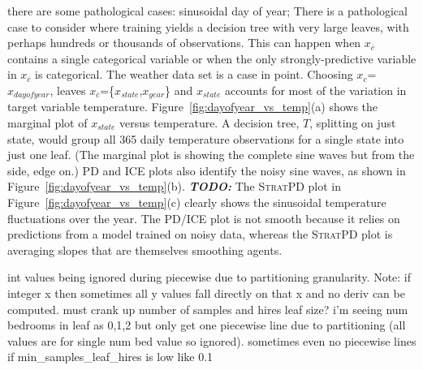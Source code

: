 \documentclass[12pt]{article}
\newcommand{\figref}[1]{Figure~\ref{#1}}
\newcommand{\todo}[1]{{\bf\em TODO:} {{\color{red}{#1}}}}
\newcommand{\spd}{\fontfamily{cmr}\textsc{\small StratPD}}
\newcommand{\xnc}{$x_{\overline{c}}$}
\begin{document}
there are some pathological cases: sinusoidal day of year; There is a pathological case to consider where training yields a decision tree with very large leaves, with perhaps hundreds or thousands of observations.  This can happen when \xnc{} contains a single categorical variable or when the only strongly-predictive variable in \xnc{} is categorical.  The weather data set is a case in point. Choosing $x_c$=$x_{dayofyear}$, leaves \xnc{}=\{$x_{state}$,$x_{year}$\} and $x_{state}$ accounts for most of the variation in target variable temperature.  \figref{fig:dayofyear_vs_temp}(a) shows the marginal plot of $x_{state}$ versus temperature. A decision tree, $T$, splitting on just state, would group all 365 daily temperature observations for a single state into just one leaf. (The marginal plot is showing the complete sine waves but from the side, edge on.)   PD and ICE plots also identify the noisy sine waves, as shown in \figref{fig:dayofyear_vs_temp}(b). \todo{uses random forest with how many trees for pd/ice?} The \spd{} plot in \figref{fig:dayofyear_vs_temp}(c) clearly shows the sinusoidal temperature fluctuations over the year. The PD/ICE plot is not smooth because it relies on predictions from a model trained on noisy data, whereas the \spd{} plot is averaging slopes that are themselves smoothing agents.


int values being ignored during piecewise due to partitioning granularity. Note: if integer x then sometimes all y values fall directly on that x and no deriv can be computed.  must crank up number of samples and hires leaf size? i'm seeing num bedrooms in leaf as 0,1,2 but only get one piecewise line due to partitioning (all values are for single num bed value so ignored). sometimes even no piecewise lines if min\_samples\_leaf\_hires is low like 0.1
\end{document}
